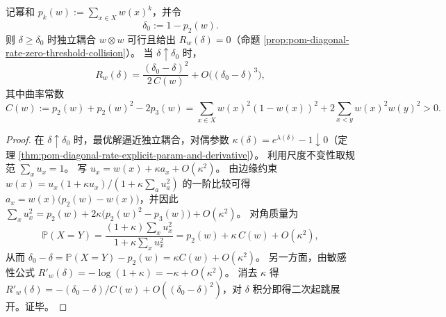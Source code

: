 \begin{theorem}\label{thm:pom-diagonal-rate-zero-rate-endpoint-quadratic-curvature}
记幂和 \(p_k(w):=\sum_{x\in X}w(x)^k\)，并令
\[
\delta_0:=1-p_2(w).
\]
则 \(\delta\ge\delta_0\) 时独立耦合 \(w\otimes w\) 可行且给出 \(R_w(\delta)=0\)（命题 \ref{prop:pom-diagonal-rate-zero-threshold-collision}）。
当 \(\delta\uparrow\delta_0\) 时，
\[
R_w(\delta)=\frac{(\delta_0-\delta)^2}{2\,C(w)}+O\bigl((\delta_0-\delta)^3\bigr),
\]
其中曲率常数
\[
C(w):=p_2(w)+p_2(w)^2-2p_3(w)
=\sum_{x\in X}w(x)^2(1-w(x))^2+2\sum_{x<y}w(x)^2w(y)^2>0.
\]
\end{theorem}
\begin{proof}
在 \(\delta\uparrow\delta_0\) 时，最优解逼近独立耦合，对偶参数 \(\kappa(\delta)=e^{\lambda(\delta)}-1\downarrow 0\)（定理 \ref{thm:pom-diagonal-rate-explicit-param-and-derivative}）。
利用尺度不变性取规范 \(\sum_x u_x=1\)。
写
\(
u_x=w(x)+\kappa a_x+O(\kappa^2)
\)。
由边缘约束
\(
w(x)=u_x(1+\kappa u_x)/(1+\kappa\sum_a u_a^2)
\)
的一阶比较可得
\(
a_x=w(x)\bigl(p_2(w)-w(x)\bigr)
\)，并因此
\(
\sum_x u_x^2=p_2(w)+2\kappa\bigl(p_2(w)^2-p_3(w)\bigr)+O(\kappa^2)
\)。
对角质量为
\[
\mathbb P(X=Y)=\frac{(1+\kappa)\sum_x u_x^2}{1+\kappa\sum_x u_x^2}
=p_2(w)+\kappa\,C(w)+O(\kappa^2),
\]
从而
\(
\delta_0-\delta=\mathbb P(X=Y)-p_2(w)=\kappa C(w)+O(\kappa^2)
\)。
另一方面，由敏感性公式
\(
R'_w(\delta)=-\log(1+\kappa)=-\kappa+O(\kappa^2)
\)。
消去 \(\kappa\) 得
\(
R'_w(\delta)=-(\delta_0-\delta)/C(w)+O((\delta_0-\delta)^2)
\)，对 \(\delta\) 积分即得二次起跳展开。证毕。
\end{proof}

